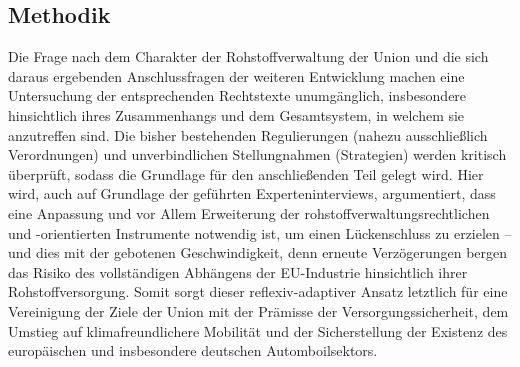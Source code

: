 \documentclass[12pt,a4paper,oneside]{book} %
\begin{document}
\subsection{Methodik}
Die Frage nach dem Charakter der Rohstoffverwaltung der Union und die sich daraus ergebenden Anschlussfragen der weiteren Entwicklung machen eine Untersuchung der entsprechenden Rechtstexte unumgänglich, insbesondere hinsichtlich ihres Zusammenhangs und dem Gesamtsystem, in welchem sie anzutreffen sind. Die bisher bestehenden Regulierungen (nahezu ausschließlich Verordnungen) und unverbindlichen Stellungnahmen (Strategien) werden kritisch überprüft, sodass die Grundlage für den anschließenden Teil gelegt wird. Hier wird, auch auf Grundlage der geführten Experteninterviews, argumentiert, dass eine Anpassung und vor Allem Erweiterung der rohstoffverwaltungsrechtlichen und -orientierten Instrumente notwendig ist, um einen Lückenschluss zu erzielen -- und dies mit der gebotenen Geschwindigkeit, denn erneute Verzögerungen bergen das Risiko des vollständigen Abhängens der EU-Industrie hinsichtlich ihrer Rohstoffversorgung. Somit sorgt dieser reflexiv-adaptiver Ansatz letztlich für eine Vereinigung der Ziele der Union mit der Prämisse der Versorgungssicherheit, dem Umstieg auf klimafreundlichere Mobilität und der Sicherstellung der Existenz des europäischen und insbesondere deutschen Automboilsektors.
\end{document}
